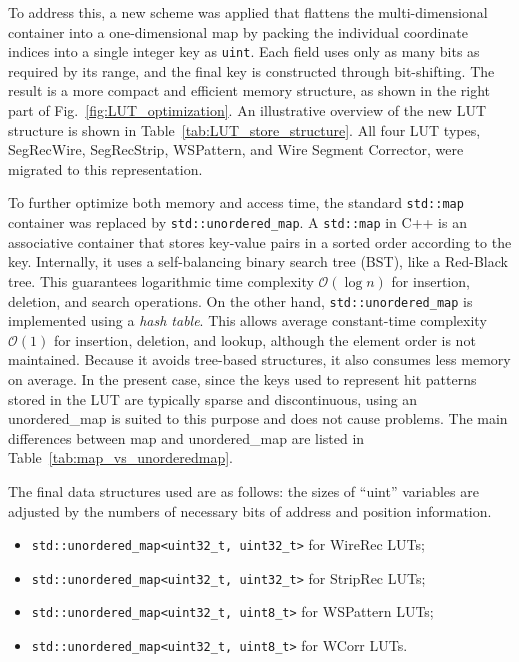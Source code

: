 To address this, a new scheme was applied that flattens the multi-dimensional container into a one-dimensional map by packing the individual coordinate indices into a single integer key as \texttt{uint}. Each field uses only as many bits as required by its range, and the final key is constructed through bit-shifting. The result is a more compact and efficient memory structure, as shown in the right part of Fig.~\ref{fig:LUT_optimization}. An illustrative overview of the new LUT structure is shown in Table~\ref{tab:LUT_store_structure}. All four LUT types, SegRecWire, SegRecStrip, WSPattern, and Wire Segment Corrector, were migrated to this representation.


To further optimize both memory and access time, the standard \texttt{std::map} container was replaced by \texttt{std::unordered\_map}. A \texttt{std::map} in C++ is an associative container that stores key-value pairs in a sorted order according to the key. Internally, it uses a self-balancing binary search tree (BST), like a Red-Black tree. This guarantees logarithmic time complexity $\mathcal{O}(\log n)$ for insertion, deletion, and search operations. On the other hand, \texttt{std::unordered\_map} is implemented using a \textit{hash table}. This allows average constant-time complexity $\mathcal{O}(1)$ for insertion, deletion, and lookup, although the element order is not maintained. Because it avoids tree-based structures, it also consumes less memory on average. In the present case, since the keys used to represent hit patterns stored in the LUT are typically sparse and discontinuous, using an unordered\_map is suited to this purpose and does not cause problems. The main differences between map and unordered\_map are listed in Table~\ref{tab:map_vs_unorderedmap}.


The final data structures used are as follows: the sizes of ``uint'' variables are adjusted by the numbers of necessary bits of address and position information.
\begin{itemize}
  \item \texttt{std::unordered\_map<uint32\_t, uint32\_t>} for WireRec LUTs;
  \item \texttt{std::unordered\_map<uint32\_t, uint32\_t>} for StripRec LUTs;
  \item \texttt{std::unordered\_map<uint32\_t, uint8\_t>}  for WSPattern LUTs;
  \item \texttt{std::unordered\_map<uint32\_t, uint8\_t>}  for WCorr LUTs.
\end{itemize}

